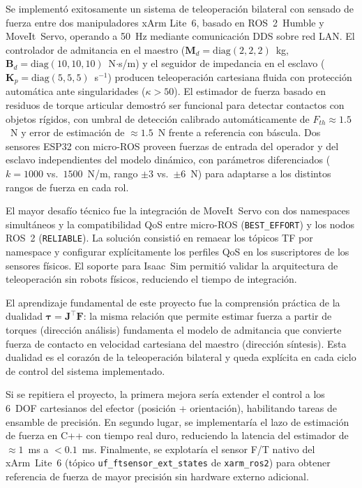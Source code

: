 \documentclass[journal,10pt,twoside]{IEEEtran}
\begin{document}
Se implementó exitosamente un sistema de teleoperación bilateral con
sensado de fuerza entre dos manipuladores xArm Lite~6, basado en
ROS~2~Humble y MoveIt~Servo, operando a 50~Hz mediante comunicación
DDS sobre red LAN. El controlador de admitancia en el maestro
($\bm{M}_d = \text{diag}(2,2,2)$~kg, $\bm{B}_d = \text{diag}(10,10,10)$~N$\cdot$s/m)
y el seguidor de impedancia en el esclavo ($\bm{K}_p = \text{diag}(5,5,5)$~s$^{-1}$)
producen teleoperación cartesiana fluida con protección automática
ante singularidades ($\kappa > 50$). El estimador de fuerza basado en
residuos de torque articular demostró ser funcional para detectar
contactos con objetos rígidos, con umbral de detección calibrado
automáticamente de $F_{th} \approx 1.5$~N y error de estimación de
${\approx}1.5$~N frente a referencia con báscula. Dos sensores ESP32
con micro-ROS proveen fuerzas de entrada del operador y del esclavo
independientes del modelo dinámico, con parámetros diferenciados
($k=1000$ vs.\ $1500$~N/m, rango $\pm3$ vs.\ $\pm6$~N) para adaptarse
a los distintos rangos de fuerza en cada rol.

El mayor desafío técnico fue la integración de MoveIt~Servo con dos
namespaces simultáneos y la compatibilidad QoS entre micro-ROS
(\texttt{BEST\_EFFORT}) y los nodos ROS~2 (\texttt{RELIABLE}).
La solución consistió en remaear los tópicos TF por namespace y
configurar explícitamente los perfiles QoS en los suscriptores de
los sensores físicos. El soporte para Isaac~Sim permitió validar
la arquitectura de teleoperación sin robots físicos, reduciendo
el tiempo de integración.

El aprendizaje fundamental de este proyecto fue la comprensión
práctica de la dualidad $\bm{\tau} = \bm{J}^\top\bm{F}$: la misma
relación que permite estimar fuerza a partir de torques
(dirección análisis) fundamenta el modelo de admitancia que convierte
fuerza de contacto en velocidad cartesiana del maestro (dirección
síntesis). Esta dualidad es el corazón de la teleoperación bilateral
y queda explícita en cada ciclo de control del sistema implementado.

Si se repitiera el proyecto, la primera mejora sería extender el
control a los 6~DOF cartesianos del efector (posición + orientación),
habilitando tareas de ensamble de precisión. En segundo lugar, se
implementaría el lazo de estimación de fuerza en C++ con tiempo real
duro, reduciendo la latencia del estimador de $\approx 1$~ms a
$< 0.1$~ms. Finalmente, se explotaría el sensor F/T nativo del
xArm~Lite~6 (tópico \texttt{uf\_ftsensor\_ext\_states} de
\texttt{xarm\_ros2}) para obtener referencia de fuerza de mayor
precisión sin hardware externo adicional.
\end{document}
